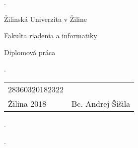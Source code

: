 \begin{titlepage}

\phantom.

\bigskip

\begin{center}
{\sc\LARGE Žilinská Univerzita v Žiline}

\medskip

{\sc\Large Fakulta riadenia a informatiky}

\vspace{4cm}

{\sc\LARGE Diplomová práca}

\medskip

{\large\bf \nazovpraceSK}

\medskip

\end{center}

\phantom.\hfill
\begin{center}

\vspace*{\fill}

\begin{tabu} to 1.0 \textwidth { X[l] X[r] }
 28360320182322 &  \\
 Žilina 2018  & Bc. Andrej Šišila  \\
\end{tabu}

\end{center}
\hspace{1.7cm}\phantom.

\vspace{2.9cm}

\phantom.
\end{titlepage}